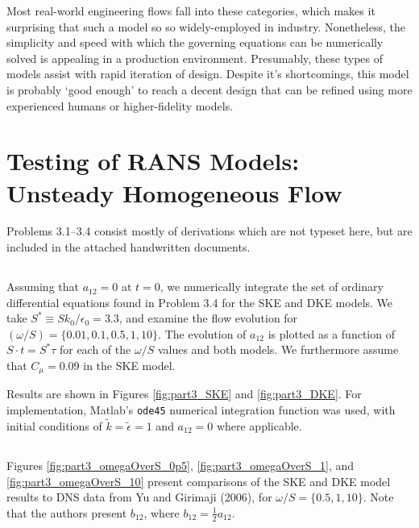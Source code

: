 \documentclass[11pt]{article}
\begin{document}
Most real-world engineering flows fall into these categories, which makes it surprising that such a model so so widely-employed in industry. Nonetheless, the simplicity and speed with which the governing equations can be numerically solved is appealing in a production environment. Presumably, these types of models assist with rapid iteration of design. Despite it's shortcomings, this model is probably `good enough' to reach a decent design that can be refined using more experienced humans or higher-fidelity models.

\section{Testing of RANS Models: Unsteady Homogeneous Flow}

Problems 3.1--3.4 consist mostly of derivations which are not typeset here, but are included in the attached handwritten documents.
\setcounter{subsection}{4}

\subsection{}

Assuming that $a_{12}=0$ at $t=0$, we numerically integrate the set of ordinary differential equations found in Problem 3.4 for the SKE and DKE models. We take $S^* \equiv S k_0 / \epsilon_0 = 3.3$, and examine the flow evolution for $(\omega/S) = \{0.01,0.1,0.5,1,10\}$. The evolution of $a_{12}$ is plotted as a function of $S \cdot t = S^* \tau$ for each of the $\omega/S$ values and both models. We furthermore assume that $C_\mu = 0.09$ in the SKE model.

Results are shown in Figures \ref{fig:part3_SKE} and \ref{fig:part3_DKE}. For implementation, Matlab's \lstinline|ode45| numerical integration function was used, with initial conditions of $\tilde{k}=\tilde{\epsilon}=1$ and $a_{12}=0$ where applicable.

\subsection{}

Figures \ref{fig:part3_omegaOverS_0p5}, \ref{fig:part3_omegaOverS_1}, and  \ref{fig:part3_omegaOverS_10} present comparisons of the SKE and DKE model results to DNS data from Yu and Girimaji (2006), for $\omega/S = \{0.5,1,10\}$. Note that the authors present $b_{12}$, where $b_{12} = \tfrac{1}{2} a_{12}$.
\end{document}
